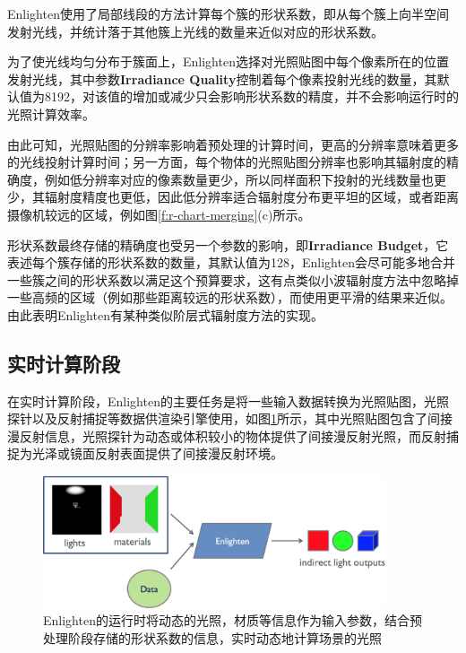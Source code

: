 Enlighten使用了局部线段的方法计算每个簇的形状系数，即从每个簇上向半空间发射光线，并统计落于其他簇上光线的数量来近似对应的形状系数。

为了使光线均匀分布于簇面上，Enlighten选择对光照贴图中每个像素所在的位置发射光线，其中参数\textbf{Irradiance Quality}控制着每个像素投射光线的数量，其默认值为8192，对该值的增加或减少只会影响形状系数的精度，并不会影响运行时的光照计算效率。

由此可知，光照贴图的分辨率影响着预处理的计算时间，更高的分辨率意味着更多的光线投射计算时间；另一方面，每个物体的光照贴图分辨率也影响其辐射度的精确度，例如低分辨率对应的像素数量更少，所以同样面积下投射的光线数量也更少，其辐射度精度也更低，因此低分辨率适合辐射度分布更平坦的区域，或者距离摄像机较远的区域，例如图\ref{f:r-chart-merging}(c)所示。

形状系数最终存储的精确度也受另一个参数的影响，即\textbf{Irradiance Budget}，它表述每个簇存储的形状系数的数量，其默认值为128，Enlighten会尽可能多地合并一些簇之间的形状系数以满足这个预算要求，这有点类似小波辐射度方法中忽略掉一些高频的区域（例如那些距离较远的形状系数），而使用更平滑的结果来近似。由此表明Enlighten有某种类似阶层式辐射度方法的实现。




\subsection{实时计算阶段}
在实时计算阶段，Enlighten的主要任务是将一些输入数据转换为光照贴图，光照探针以及反射捕捉等数据供渲染引擎使用，如图\ref{f:r-enlighten-runtime}所示，其中光照贴图包含了间接漫反射信息，光照探针为动态或体积较小的物体提供了间接漫反射光照，而反射捕捉为光泽或镜面反射表面提供了间接漫反射环境。

 \begin{figure}
	\begin{center}
		\includegraphics[width=0.9\textwidth]{figures/r/path-29-2}
	\end{center}
	\caption{Enlighten的运行时将动态的光照，材质等信息作为输入参数，结合预处理阶段存储的形状系数的信息，实时动态地计算场景的光照}
	\label{f:r-enlighten-runtime}
\end{figure}

